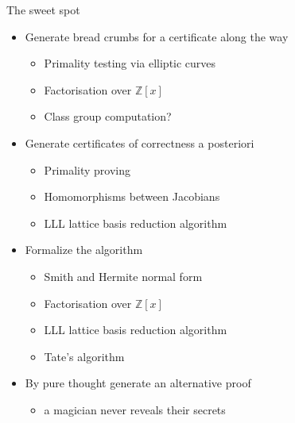 \documentclass[11pt, aspectratio=169]{beamer}
\newcommand{\Z}{\mathbb{Z}}
\begin{document}
\begin{frame}{The sweet spot}
    \begin{itemize}
        \item {} Generate bread crumbs for a certificate along the way
            \begin{itemize}
                \item Primality testing via elliptic curves
                \item Factorisation over $\Z[x]$
                \item Class group computation?
            \end{itemize}
        \item {} Generate certificates of correctness a posteriori
            \begin{itemize}
                \item Primality proving
                \item Homomorphisms between Jacobians
                \item LLL lattice basis reduction algorithm
            \end{itemize}
        \item {} Formalize the algorithm
            \begin{itemize}
                \item Smith and Hermite normal form
                \item Factorisation over $\Z[x]$
                \item LLL lattice basis reduction algorithm
                \item Tate's algorithm
            \end{itemize}
        \item {} By pure thought generate an alternative proof
            \begin{itemize}
                \item a magician never reveals their secrets
            \end{itemize}
    \end{itemize}
\end{frame}
\end{document}
